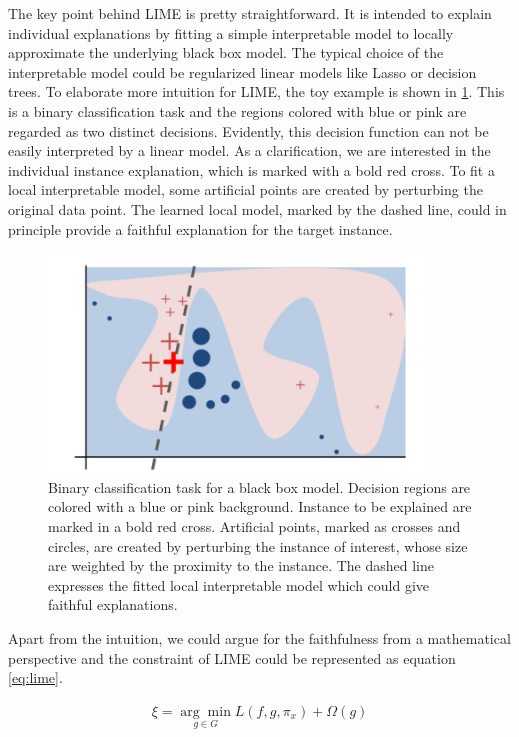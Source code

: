 The key point behind LIME is pretty straightforward. It is intended to explain individual explanations by fitting a simple interpretable model to locally approximate the underlying black box model. The typical choice of the interpretable model could be regularized linear models like Lasso or decision trees. To elaborate more intuition for LIME, the toy example is shown in \ref{fig:lime}. This is a binary classification task and the regions colored with blue or pink are regarded as two distinct decisions. Evidently, this decision function can not be easily interpreted by a linear model. As a clarification, we are interested in the individual instance explanation, which is marked with a bold red cross. To fit a local interpretable model, some artificial points are created by perturbing the original data point. The learned local model, marked by the dashed line, could in principle provide a faithful explanation for the target instance. 

\begin{figure}[H]%
	\includegraphics[width=0.9\textwidth]{imgs/lime.png}
	\caption{Binary classification task for a black box model. Decision regions are colored with a blue or pink background. Instance to be explained are marked in a bold red cross. Artificial points, marked as crosses and circles, are created by perturbing the instance of interest, whose size are weighted by the proximity to the instance. The dashed line expresses the fitted local interpretable model which could give faithful explanations.}
	\label{fig:lime}
\end{figure}

Apart from the intuition, we could argue for the faithfulness from a mathematical perspective and the constraint of LIME could be represented as equation \ref{eq:lime}. 

\begin{equation} \label{eq:lime}
\begin{gathered}
\xi=\underset{g \in {G}}{\arg \min } L\left(f, g, \pi_{x}\right)+\Omega(g)
\end{gathered}
\end{equation}

